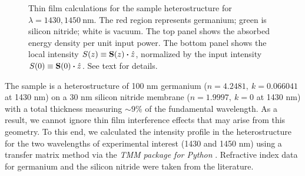 \begin{figure}
	\centering
	
	\caption{Thin film calculations for the sample heterostructure for $\lambda = 1430, 1450 \ \textrm{nm}$. The red region represents germanium; green is silicon nitride; white is vacuum. The top panel shows the absorbed energy density per unit input power. The bottom panel shows the local intensity $S(z) \equiv \vb{S}(z) \vdot \hat{z}$, normalized by the input intensity $S(0) \equiv \vb{S}(0) \vdot \hat{z}$. See text for details.}
	\label{fig:GeSiN_RAT:both}
\end{figure}

The sample is a heterostructure of 100 nm germanium ($n = 4.2481, \ k=0.066041$ at 1430 nm) on a 30 nm silicon nitride membrane ($n=1.9997, \ k=0$ at 1430 nm) with a total thickness measuring $\sim 9$\% of the fundamental wavelength. As a result, we cannot ignore thin film interference effects that may arise from this geometry. To this end, we calculated the intensity profile in the heterostructure for the two wavelengths of experimental interest (1430 and 1450 nm) using a transfer matrix method via the \textit{TMM package for Python} \cite{byrnesTmmSimulateLight2017,byrnesMultilayerOpticalCalculations2019}. Refractive index data for germanium \cite{nunleyOpticalConstantsGermanium2016} and the silicon nitride \cite{lukeBroadbandMidinfraredFrequency2015} were taken from the literature.

